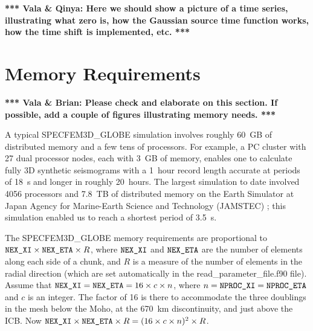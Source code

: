 \documentclass[onecolumn]{article}
\newcommand{\tovalabrian}[1]{\textbf{*** Vala \& Brian: #1 ***}}
\newcommand{\tovalaqinya}[1]{\textbf{*** Vala \& Qinya: #1 ***}}
\newcommand{\nexxi}{\mbox{\texttt{NEX\_XI}}}
\newcommand{\nexeta}{\mbox{\texttt{NEX\_ETA}}}
\newcommand{\nprocxi}{\mbox{\texttt{NPROC\_XI}}}
\newcommand{\nproceta}{\mbox{\texttt{NPROC\_ETA}}}
\begin{document}
\tovalaqinya{Here we should show a picture of a time series, illustrating what
zero is, how the Gaussian source time function works, how the time
shift is implemented, etc.}

\section{Memory Requirements}
\tovalabrian{Please check and elaborate on this section. If possible, add a couple
of figures illustrating memory needs.}

A typical SPECFEM3D\_GLOBE simulation involves roughly 60~GB of distributed
memory and a few tens of processors. For example,
a PC cluster with 27 dual processor nodes, each with 3~GB of memory,
enables one to calculate fully 3D synthetic seismograms with
a 1~hour record length accurate at periods of 18~s and longer in roughly
20~hours.
The largest simulation to date involved 4056 processors and 7.8~TB
of distributed memory on the Earth Simulator at
Japan Agency for Marine-Earth Science and Technology (JAMSTEC)
\cite{KoTsChTr03,TsKoChTr03}; this simulation enabled us to reach a
shortest period of 3.5~s.

The SPECFEM3D\_GLOBE memory requirements are proportional to
$\nexxi\times \nexeta\times R$,
where $\nexxi$ and $\nexeta$ are the number of elements along each side of a
chunk, and $R$ is a measure of the number of elements in the radial
direction (which are set automatically in the read\_parameter\_file.f90 file).
Assume that $\nexxi=\nexeta=16\times c\times n$,
where $n=\nprocxi=\nproceta$ and $c$ is an integer.
The factor of 16 is there to accommodate the three doublings in the mesh
below the Moho, at the 670~km discontinuity, and just above the ICB.
Now $\nexxi\times \nexeta\times R = (16\times c\times n)^2\times R$.
\end{document}
